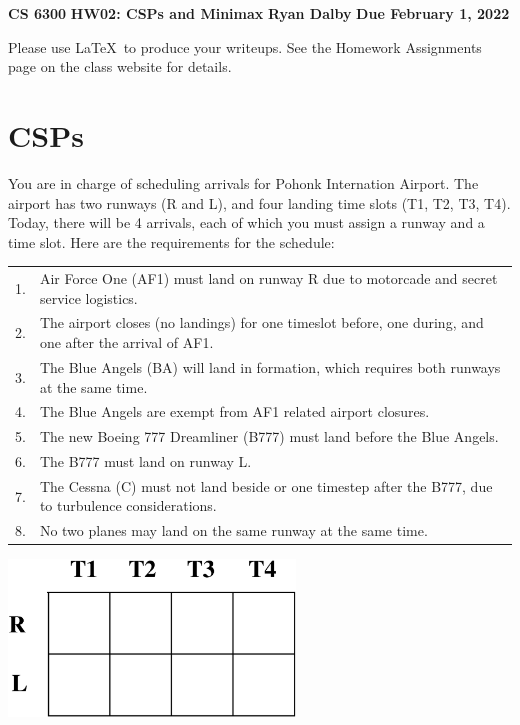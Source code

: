 \documentclass[11pt]{article}
\begin{document}
\thispagestyle{empty}

\begin{center}
{\bf CS 6300} \hfill {\large\bf HW02:  CSPs and Minimax} \hfill {\bf Ryan Dalby} \hfill {\bf Due February 1, 2022}
\end{center}

Please use \LaTeX\ to produce your writeups. See the Homework Assignments 
page on the class website for details.

\section{CSPs}

You are in charge of scheduling arrivals for Pohonk Internation
Airport.  The airport has two runways (R and L), and four landing time
slots (T1, T2, T3, T4).  Today, there will be 4 arrivals, each of
which you must assign a runway and a time slot.  Here are the
requirements for the schedule:

{\small

\begin{center}\begin{tabular}{ll}
1. & Air Force One (AF1) must land on runway R due to motorcade and secret service logistics. \\
2. & The airport closes (no landings) for one timeslot before, one during, and one after the arrival of AF1. \\
3. & The Blue Angels (BA) will land in formation, which requires both runways at the same time. \\
4. & The Blue Angels are exempt from AF1 related airport closures. \\
5. & The new Boeing 777 Dreamliner (B777) must land before the Blue Angels. \\
6. & The B777 must land on runway L. \\
7. & The Cessna (C) must not land beside or one timestep after the B777, due to turbulence considerations. \\
8. & No two planes may land on the same runway at the same time. 
\end{tabular}\end{center}

}

\begin{center}
\includegraphics[width=3in]{Airport.eps}
\end{center}
\end{document}
